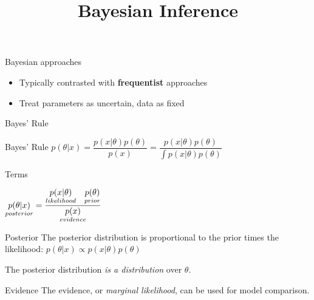 \documentclass[10pt]{beamer}
\title{Bayesian Inference}
\begin{document}
\maketitle




\begin{frame}{Bayesian approaches}

\begin{itemize}
\item Typically contrasted with \textbf{frequentist} approaches
\item Treat parameters as uncertain, data as fixed
\end{itemize}
\end{frame}


\begin{frame}{Bayes' Rule}
\footnotesize

\begin{sblock}{Bayes' Rule}
$ p(\theta | x) = \dfrac{p(x | \theta) p(\theta)}{p(x)} =\dfrac{p(x | \theta) p(\theta)}{\int p(x | \theta) p(\theta)}  $
\end{sblock}

\begin{sblock}{Terms}

$ \underset{posterior}{p(\theta|x)} = \displaystyle\frac{ \underset{likelihood}{p(x|\theta)} \quad  \underset{prior}{p(\theta)} }{ \underset{evidence}{p(x)}} $
\end{sblock}

\begin{sblock}{Posterior}
The posterior distribution is proportional to the prior times the likelihood:
$p(\theta | x) \propto p(x | \theta) p(\theta)$

The posterior distribution \textit{is a distribution} over $\theta$.

\end{sblock}

\begin{sblock}{Evidence}
The evidence, or \textit{marginal likelihood}, can be used for model comparison.
\end{sblock}

\end{frame}

\end{document}
